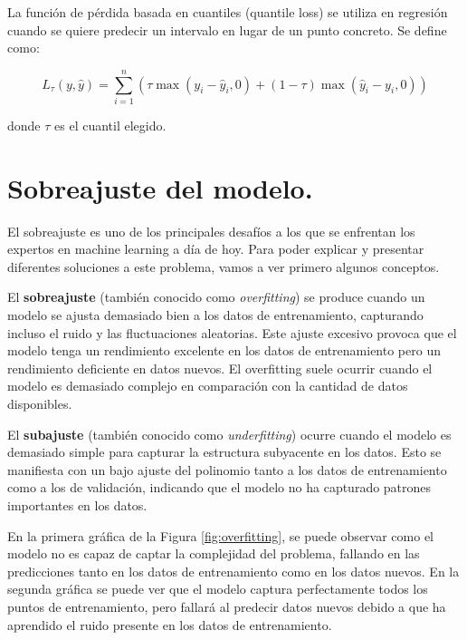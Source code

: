 La función de pérdida basada en cuantiles (quantile loss) se utiliza en regresión cuando se quiere predecir un intervalo en lugar de un punto concreto. Se define como:

\begin{equation}
    L_{\tau}(y, \hat{y}) = \sum_{i=1}^{n} \left(\tau \max(y_i - \hat{y}_i, 0) + (1 - \tau) \max(\hat{y}_i - y_i, 0)\right)
\end{equation}

donde \(\tau\) es el cuantil elegido.














\section{Sobreajuste del modelo.}

El sobreajuste es uno de los principales desafíos a los que se enfrentan los expertos en machine learning a día de hoy. Para poder explicar y presentar diferentes soluciones a este problema, vamos a ver primero algunos conceptos.


El \textbf{sobreajuste} (también conocido como \textit{overfitting}) se produce cuando un modelo se ajusta demasiado bien a los datos de entrenamiento, capturando incluso el ruido y las fluctuaciones aleatorias. Este ajuste excesivo provoca que el modelo tenga un rendimiento excelente en los datos de entrenamiento pero un rendimiento deficiente en datos nuevos. El overfitting suele ocurrir cuando el modelo es demasiado complejo en comparación con la cantidad de datos disponibles.

El \textbf{subajuste} (también conocido como \textit{underfitting}) ocurre cuando el modelo es demasiado simple para capturar la estructura subyacente en los datos. Esto se manifiesta con un bajo ajuste del polinomio tanto a los datos de entrenamiento como a los de validación, indicando que el modelo no ha capturado patrones importantes en los datos.

En la primera gráfica de la Figura \ref{fig:overfitting}, se puede observar como el modelo no es capaz de captar la complejidad del problema, fallando en las predicciones tanto en los datos de entrenamiento como en los datos nuevos. En la segunda gráfica se puede ver que el modelo captura perfectamente todos los puntos de entrenamiento, pero fallará al predecir datos nuevos debido a que ha aprendido el ruido presente en los datos de entrenamiento.

